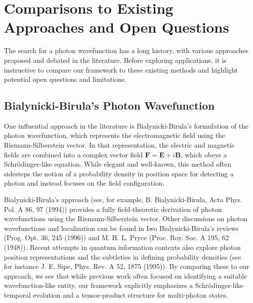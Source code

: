 \documentclass[aps,prl,twocolumn,showpacs,showkeys,superscriptaddress,amsmath,amssymb]{revtex4-2}
\begin{document}

\section{Comparisons to Existing Approaches and Open Questions}
\label{sec:comparisons}

The search for a photon wavefunction has a long history, with various approaches proposed and debated in the literature. Before exploring applications, it is instructive to compare our framework to these existing methods and highlight potential open questions and limitations.


\subsection{Bialynicki-Birula’s Photon Wavefunction}

One influential approach in the literature is Bialynicki-Birula’s formulation of the photon wavefunction, which represents the electromagnetic field using the Riemann-Silberstein vector. In that representation, the electric and magnetic fields are combined into a complex vector field $\mathbf{F} = \mathbf{E} + i\mathbf{B}$, which obeys a Schr\"odinger-like equation. While elegant and well-known, this method often sidesteps the notion of a probability density in position space for detecting a photon and instead focuses on the field configuration.


Bialynicki-Birula’s approach (see, for example, B. Bialynicki-Birula, Acta Phys. Pol. A 86, 97 (1994)) provides a fully field-theoretic derivation of photon wavefunctions using the Riemann-Silberstein vector. Other discussions on photon wavefunctions and localization can be found in Iwo Bialynicki-Birula’s reviews (Prog. Opt. 36, 245 (1996)) and M. H. L. Pryce (Proc. Roy. Soc. A 195, 62 (1948)). Recent attempts in quantum information contexts also explore photon position representations and the subtleties in defining probability densities (see for instance J. E. Sipe, Phys. Rev. A 52, 1875 (1995)). By comparing these to our approach, we see that while previous work often focused on identifying a suitable wavefunction-like entity, our framework explicitly emphasizes a Schr\"odinger-like temporal evolution and a tensor-product structure for multi-photon states.
\end{document}
